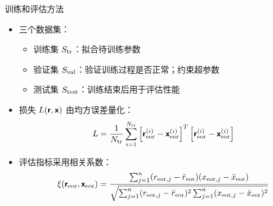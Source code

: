 \documentclass{beamer}
\begin{document}
\begin{frame}[t]
  \begin{alertblock}{训练和评估方法}
  \end{alertblock}
  \begin{itemize}
    \item 三个数据集：
      \begin{itemize}
        \item \alert{训练集 $S_{\text{tr}}$}：拟合待训练参数
        \item \alert{验证集 $S_{\text{val}}$}：验证训练过程是否正常；约束超参数
        \item \alert{测试集 $S_{\text{test}}$}：训练结束后用于评估性能
      \end{itemize}
    \item 损失 $L(\bm{\mathsf{r}}, \bm{\mathsf{x}})$ 由\alert{均方误差}量化：
      \begin{equation}
        L = \frac{1}{N_{\text{tr}}} \sum_{i=1}^{N_{\text{tr}}}
            \left[ \bm{\mathsf{r}}_{\text{eor}}^{(i)} - \bm{\mathsf{x}}_{\text{eor}}^{(i)} \right]^T
            \left[ \bm{\mathsf{r}}_{\text{eor}}^{(i)} - \bm{\mathsf{x}}_{\text{eor}}^{(i)} \right]
      \end{equation}
    \item 评估指标采用\alert{相关系数}：
      \begin{equation}
        \xi(\bm{\mathsf{r}}_{\text{eor}}, \bm{\mathsf{x}}_{\text{eor}})
          = \frac{\sum_{j=1}^{n}(r_{\text{eor},j} - \bar{r}_{\text{eor}})
              (x_{\text{eor},j} - \bar{x}_{\text{eor}})}{
                \sqrt{\sum_{j=1}^{n}(r_{\text{eor},j} - \bar{r}_{\text{eor}})^2
                \sum_{j=1}^{n}(x_{\text{eor},j} - \bar{x}_{\text{eor}})^2}
            }
      \end{equation}
  \end{itemize}
\end{frame}
\end{document}

